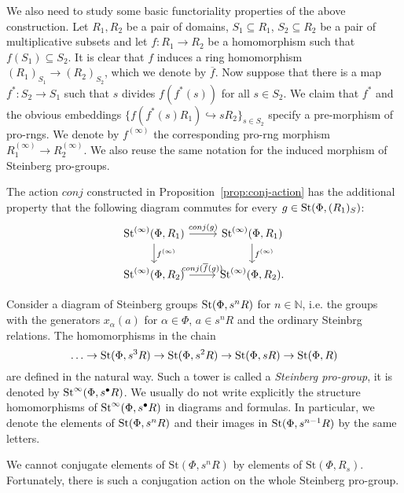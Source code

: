 \documentclass[oneside, 11pt]{amsart} \pdfoutput=1
\begin{document}
We also need to study some basic functoriality properties of the above construction.
Let $R_1, R_2$ be a pair of domains, $S_1 \subseteq R_1$, $S_2 \subseteq R_2$ be a pair of multiplicative subsets and let $f \colon R_1 \to R_2$ be a homomorphism such that $f(S_1)\subseteq S_2$.
It is clear that $f$ induces a ring homomorphism $(R_1)_{S_1} \to (R_2)_{S_2}$, which we denote by $\overline{f}$.
Now suppose that there is a map $f^* \colon S_2 \to S_1$ such that $s$ divides $f(f^*(s))$ for all $s \in S_2$. We claim that $f^*$ and the obvious embeddings $\{f(f^*(s)R_1) \hookrightarrow sR_2\}_{s\in S_2}$ specify a pre-morphism of pro-rngs. We denote by $f^{(\infty)}$ the corresponding pro-rng morphism $R_1^{(\infty)} \to R_2^{(\infty)}$. We also reuse the same notation for the induced morphism of Steinberg pro-groups.

\begin{prop}
 The action $conj$ constructed in Proposition~\ref{prop:conj-action} has the additional property that the following diagram commutes for every $g \in \mathop{\mathrm{St}}\nolimits(\Phi, (R_1)_S)$:
 \[ \begin{tikzcd} \St^{(\infty)}(\Phi, R_1) \ar{r}{conj(g)} \ar{d}{f^{(\infty)}} & \St^{(\infty)}(\Phi, R_1) \ar{d}{f^{(\infty)}} \\ \St^{(\infty)}(\Phi, R_2) \ar{r}{conj(\overline{f}(g))} & \St^{(\infty)}(\Phi, R_2). \end{tikzcd} \]
\end{prop}

Consider a diagram of Steinberg groups $\mathop{\mathrm{St}}\nolimits(\Phi, s^n R)$ for $n \in \mathbb N$, i.e. the groups with the generators $x_{\alpha}(a)$ for $\alpha \in \Phi$, $a \in s^n R$ and the ordinary Steinbrg relations. The homomorphisms in the chain
$$ \ldots \to \mathop{\mathrm{St}}\nolimits(\Phi, s^3 R) \to \mathop{\mathrm{St}}\nolimits(\Phi, s^2 R) \to \mathop{\mathrm{St}}\nolimits(\Phi, s R) \to \mathop{\mathrm{St}}\nolimits(\Phi, R) $$
are defined in the natural way. Such a tower is called a {\it Steinberg pro-group}, it is denoted by $\mathop{\mathrm{St}}\nolimits^\infty(\Phi, s^\bullet R)$. We usually do not write explicitly the structure homomorphisms of $\mathop{\mathrm{St}}\nolimits^\infty(\Phi, s^\bullet R)$ in diagrams and formulas. In particular, we denote the elements of $\mathop{\mathrm{St}}\nolimits(\Phi, s^n R)$ and their images in $\mathop{\mathrm{St}}\nolimits(\Phi, s^{n - 1} R)$ by the same letters.

We cannot conjugate elements of $\mathrm{St}(\Phi, s^nR)$ by elements of $\mathrm{St}(\Phi, R_s)$. Fortunately, there is such a conjugation action on the whole Steinberg pro-group.
\end{document}
